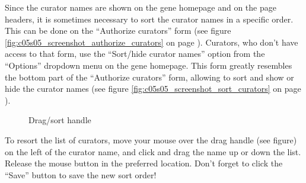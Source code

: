 \documentclass[a4paper,oneside,openany,12pt]{memoir}
\renewenvironment{leftbar}[1][\hsize]
{%
    \def\FrameCommand
    {%
        {\color{LOVDdark}\vrule width 3pt \hspace{5pt}}%
        \colorbox{LOVDlight}%
    }%
    \MakeFramed{\hsize#1\advance\hsize-\width\FrameRestore}%
}
{\endMakeFramed}
\begin{document}
Since the curator names are shown on the gene homepage and on the page headers, it is sometimes necessary to sort the curator names in a specific order.
This can be done on the ``Authorize curators'' form (see figure \ref{fig:c05s05_screenshot_authorize_curators}
 on page \pageref{fig:c05s05_screenshot_authorize_curators}).
Curators, who don't have access to that form, use the ``Sort/hide curator names'' option from the ``Options'' dropdown menu on the gene homepage.
This form greatly resembles the bottom part of the ``Authorize curators'' form, allowing to sort and show or
 hide the curator names (see figure \ref{fig:c05s05_screenshot_sort_curators} on page \pageref{fig:c05s05_screenshot_sort_curators}).

\begin{figure} %
  \vspace{-25pt}
  \begin{framed}
     Drag/sort handle
  \end{framed}
\end{figure}
To resort the list of curators, move your mouse over the drag handle (see figure) on the left
 of the curator name, and click and drag the name up or down the list.
Release the mouse button in the preferred location.
Don't forget to click the ``Save'' button to save the new sort order!
\clearpage %










\hypertarget{chap:transcripts}{}
\end{document}
